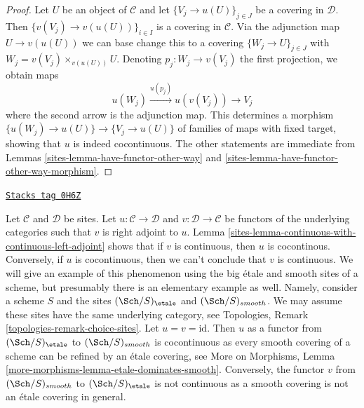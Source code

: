 \begin{proof}

Let $U$ be an object of $\mathcal{C}$ and let $\{V_j \to u(U)\}_{j \in J}$
be a covering in $\mathcal{D}$. Then $\{v(V_j) \to v(u(U))\}_{i \in I}$ is
a covering in $\mathcal{C}$. Via the adjunction map $U \to v(u(U))$ we
can base change this to a covering $\{W_j \to U\}_{j \in J}$ with
$W_j = v(V_j) \times_{v(u(U))} U$. Denoting $p_j : W_j \to v(V_j)$ the
first projection, we obtain maps
$$
u(W_j) \xrightarrow{u(p_j)} u(v(V_j)) \longrightarrow V_j
$$
where the second arrow is the adjunction map. This determines a morphism
$\{u(W_j) \to u(U)\} \to \{V_j \to u(U)\}$ of families of maps with fixed
target, showing that $u$ is indeed cocontinuous. The other statements are
immediate from Lemmas \ref{sites-lemma-have-functor-other-way} and
\ref{sites-lemma-have-functor-other-way-morphism}.
\end{proof}

\begin{example}
\label{sites-example-not-equivalent}
\href{https://stacks.math.columbia.edu/tag/0H6Z}{\texttt{Stacks tag 0H6Z}}

Let $\mathcal{C}$ and $\mathcal{D}$ be sites. Let
$u : \mathcal{C} \to \mathcal{D}$ and $v : \mathcal{D} \to \mathcal{C}$
be functors of the underlying categories such that $v$ is right adjoint to $u$.
Lemma \ref{sites-lemma-continuous-with-continuous-left-adjoint}
shows that if $v$ is continuous, then $u$ is cocontinous.
Conversely, if $u$ is cocontinuous, then we can't conclude that $v$
is continuous. We will give an example of this phenomenon using
the big \'etale and smooth sites of a scheme, but presumably there is an
elementary example as well. Namely, consider a scheme $S$ and the sites
$(\Sch/S)_\etale$ and $(\Sch/S)_{smooth}$. We may assume these
sites have the same underlying category, see
Topologies, Remark \ref{topologies-remark-choice-sites}.
Let $u = v = \text{id}$. Then $u$ as a functor
from $(\Sch/S)_\etale$ to $(\Sch/S)_{smooth}$ is cocontinuous
as every smooth covering of a scheme can be refined by an \'etale
covering, see More on Morphisms, Lemma
\ref{more-morphisms-lemma-etale-dominates-smooth}.
Conversely, the functor $v$ from $(\Sch/S)_{smooth}$ to $(\Sch/S)_\etale$
is not continuous as a smooth covering is not an \'etale covering in general.
\end{example}

